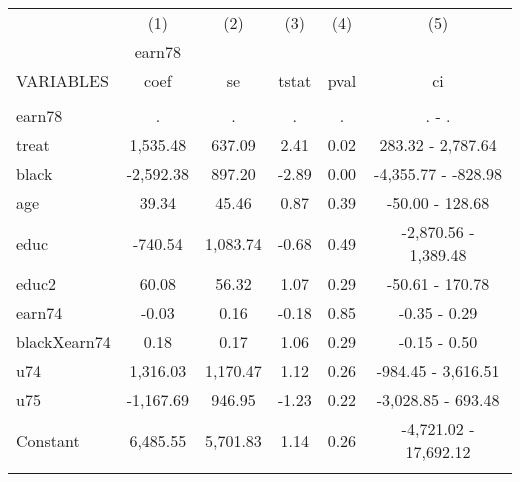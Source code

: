 \documentclass[]{article}
\begin{document}
\begin{tabular}{lccccc} \hline
 & (1) & (2) & (3) & (4) & (5) \\
 & earn78 &  &  &  &  \\
VARIABLES & coef & se & tstat & pval & ci \\ \hline
 &  &  &  &  &  \\
earn78 & . & . & . & . & . - . \\
treat & 1,535.48 & 637.09 & 2.41 & 0.02 & 283.32 - 2,787.64 \\
black & -2,592.38 & 897.20 & -2.89 & 0.00 & -4,355.77 - -828.98 \\
age & 39.34 & 45.46 & 0.87 & 0.39 & -50.00 - 128.68 \\
educ & -740.54 & 1,083.74 & -0.68 & 0.49 & -2,870.56 - 1,389.48 \\
educ2 & 60.08 & 56.32 & 1.07 & 0.29 & -50.61 - 170.78 \\
earn74 & -0.03 & 0.16 & -0.18 & 0.85 & -0.35 - 0.29 \\
blackXearn74 & 0.18 & 0.17 & 1.06 & 0.29 & -0.15 - 0.50 \\
u74 & 1,316.03 & 1,170.47 & 1.12 & 0.26 & -984.45 - 3,616.51 \\
u75 & -1,167.69 & 946.95 & -1.23 & 0.22 & -3,028.85 - 693.48 \\
Constant & 6,485.55 & 5,701.83 & 1.14 & 0.26 & -4,721.02 - 17,692.12 \\
 &  &  &  &  &  \\ \hline
\end{tabular}
\end{document}
